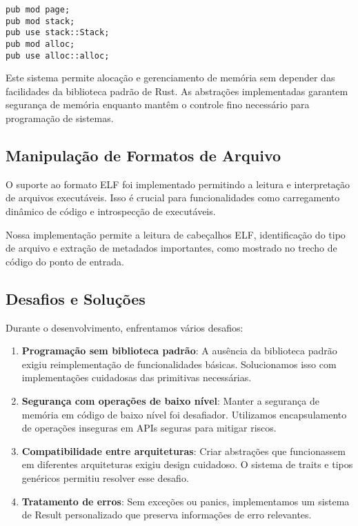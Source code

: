 \documentclass[12pt,a4paper]{article}
\begin{document}
\begin{lstlisting}
pub mod page;
pub mod stack;
pub use stack::Stack;
pub mod alloc;
pub use alloc::alloc;
\end{lstlisting}

Este sistema permite alocação e gerenciamento de memória sem depender das facilidades da biblioteca padrão de Rust. As abstrações implementadas garantem segurança de memória enquanto mantêm o controle fino necessário para programação de sistemas.

\subsection{Manipulação de Formatos de Arquivo}

O suporte ao formato ELF foi implementado permitindo a leitura e interpretação de arquivos executáveis. Isso é crucial para funcionalidades como carregamento dinâmico de código e introspecção de executáveis.

Nossa implementação permite a leitura de cabeçalhos ELF, identificação do tipo de arquivo e extração de metadados importantes, como mostrado no trecho de código do ponto de entrada.

\subsection{Desafios e Soluções}

Durante o desenvolvimento, enfrentamos vários desafios:

\begin{enumerate}
    \item \textbf{Programação sem biblioteca padrão}: A ausência da biblioteca padrão exigiu reimplementação de funcionalidades básicas. Solucionamos isso com implementações cuidadosas das primitivas necessárias.

    \item \textbf{Segurança com operações de baixo nível}: Manter a segurança de memória em código de baixo nível foi desafiador. Utilizamos encapsulamento de operações inseguras em APIs seguras para mitigar riscos.

    \item \textbf{Compatibilidade entre arquiteturas}: Criar abstrações que funcionassem em diferentes arquiteturas exigiu design cuidadoso. O sistema de traits e tipos genéricos permitiu resolver esse desafio.

    \item \textbf{Tratamento de erros}: Sem exceções ou panics, implementamos um sistema de Result personalizado que preserva informações de erro relevantes.
\end{enumerate}
\end{document}
